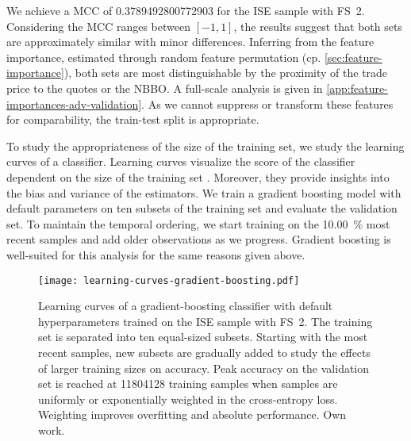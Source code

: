 We achieve a \gls{MCC} of \num{0.3789492800772903} for the \gls{ISE} sample with FS~2. Considering the \gls{MCC} ranges between $\left[-1, 1\right]$, the results suggest that both sets are approximately similar with minor differences. Inferring from the feature importance, estimated through random feature permutation (cp. \cref{sec:feature-importance}), both sets are most distinguishable by the proximity of the trade price to the quotes or the \gls{NBBO}. A full-scale analysis is given in \cref{app:feature-importances-adv-validation}. As we cannot suppress or transform these features for comparability, the train-test split is appropriate.

To study the appropriateness of the size of the training set, we study the learning curves of a classifier. Learning curves visualize the score of the classifier dependent on the size of the training set \autocite[][243]{hastietrevorElementsStatisticalLearning2009}. Moreover, they provide insights into the bias and variance of the estimators. We train a gradient boosting model with default parameters on ten subsets of the training set and evaluate the validation set. To maintain the temporal ordering, we start training on the \SI{10.00}{\percent} most recent samples and add older observations as we progress. Gradient boosting is well-suited for this analysis for the same reasons given above.

\begin{figure}[ht]
    \centering
    \texttt{[image: learning-curves-gradient-boosting.pdf]}
    \caption[Learning Curves of a Gradient-Boosted Tree on the \Gls{ISE} Sample]{Learning curves of a gradient-boosting classifier with default hyperparameters trained on the \gls{ISE} sample with FS~2. The training set is separated into ten equal-sized subsets. Starting with the most recent samples, new subsets are gradually added to study the effects of larger training sizes on accuracy. Peak accuracy  on the validation set is reached at \num{11804128} training samples when samples are uniformly or exponentially weighted in the cross-entropy loss. Weighting improves overfitting and absolute performance. Own work.}
    \label{fig:learning-curves-gradient-boosting}
\end{figure}

